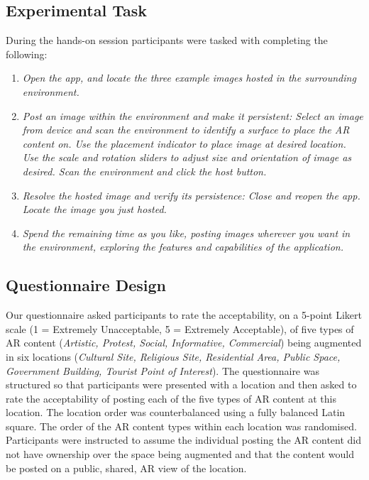 \subsection{Experimental Task}
\label{tasks_outline}
During the hands-on session participants were tasked with completing the following: 

\begin{enumerate}
    \item \textit{Open the app, and locate the three example images hosted in the surrounding environment.} 

    \item \textit{Post an image within the environment and make it persistent: Select an image from device and scan the environment to identify a surface to place the AR content on. Use the placement indicator to place image at desired location. Use the scale and rotation sliders to adjust size and orientation of image as desired. Scan the environment and click the host button.}
    
    \item \textit{Resolve the hosted image and verify its persistence: Close and reopen the app. Locate the image you just hosted.}
    
    \item \textit{Spend the remaining time as you like, posting images wherever you want in the environment, exploring the features and capabilities of the application.}
\end{enumerate}


 
\subsection{Questionnaire Design}
Our questionnaire asked participants to rate the acceptability, on a 5-point Likert scale (1 = Extremely Unacceptable, 5 = Extremely Acceptable), of five types of AR content (\textit{Artistic, Protest, Social, Informative, Commercial}) being augmented in six locations (\textit{Cultural Site, Religious Site, Residential Area, Public Space, Government Building, Tourist Point of Interest}). 
The questionnaire was structured so that participants were presented with a location and then asked to rate the acceptability of posting each of the five types of AR content at this location. 
The location order was counterbalanced using a fully balanced Latin square. 
The order of the AR content types within each location was randomised. 
Participants were instructed to assume the individual posting the AR content did not have ownership over the space being augmented and that the content would be posted on a public, shared, AR view of the location.  

